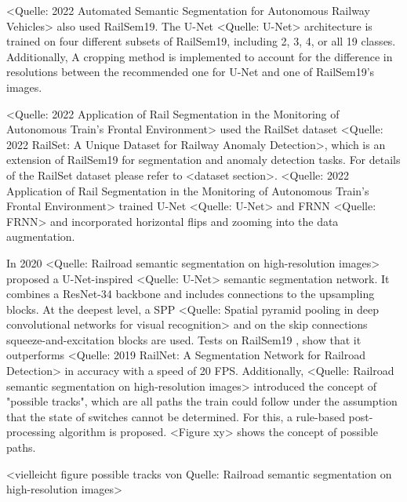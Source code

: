 <Quelle: 2022 Automated Semantic Segmentation for Autonomous Railway Vehicles> also used RailSem19.
The U-Net <Quelle: U-Net> architecture is trained on four different subsets of RailSem19, including 2, 3, 4, or all 19 classes.
Additionally, A cropping method is implemented to account for the difference in resolutions between the recommended one for U-Net and one of RailSem19's images.

<Quelle: 2022 Application of Rail Segmentation in the Monitoring of Autonomous Train’s Frontal Environment> used the RailSet dataset <Quelle: 2022 RailSet: A Unique Dataset for Railway Anomaly Detection>, which is an extension of RailSem19 for segmentation and anomaly detection tasks.
For details of the RailSet dataset please refer to <dataset section>.
<Quelle: 2022 Application of Rail Segmentation in the Monitoring of Autonomous Train’s Frontal Environment> trained U-Net <Quelle: U-Net> and FRNN <Quelle: FRNN> and incorporated horizontal flips and zooming into the data augmentation.

In 2020 <Quelle: Railroad semantic segmentation on high-resolution images> proposed a U-Net-inspired <Quelle: U-Net> semantic segmentation network.
It combines a ResNet-34 backbone and includes connections to the upsampling blocks.
At the deepest level, a \ac{SPP} <Quelle: Spatial pyramid pooling in deep convolutional networks for visual recognition> and on the skip connections squeeze-and-excitation blocks \cite{SqueezeAndExcitation2019} are used.
Tests on RailSem19 \cite{railsem19dataset}, show that it outperforms \cite{railNet2019} <Quelle: 2019 RailNet: A Segmentation Network for Railroad Detection> in accuracy with a speed of 20 \ac{FPS}.
Additionally, <Quelle: Railroad semantic segmentation on high-resolution images> introduced the concept of "possible tracks", which are all paths the train could follow under the assumption that the state of switches cannot be determined.
For this, a rule-based post-processing algorithm is proposed. <Figure xy> shows the concept of possible paths.

\vspace{1cm}

<vielleicht figure possible tracks von Quelle: Railroad semantic segmentation on high-resolution images>

\vspace{1cm}

